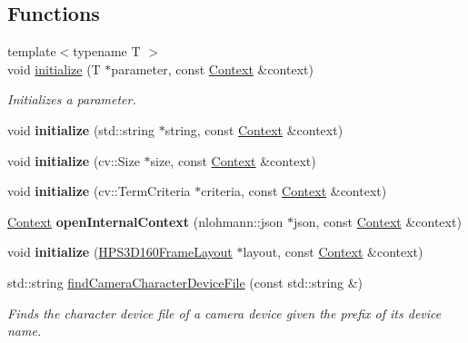 \subsection*{Functions}
\begin{DoxyCompactItemize}
\item 
{\footnotesize template$<$typename T $>$ }\\void \hyperlink{namespacestereo__ugv_a6971cc11001fdf589a71f6fb3099c65b}{initialize} (T $\ast$parameter, const \hyperlink{classstereo__ugv_1_1Context}{Context} \&context)
\begin{DoxyCompactList}\small\item\em Initializes a parameter. \end{DoxyCompactList}\item 
\mbox{\label{namespacestereo__ugv_aaa158ec1ee9178414843adbbb91a394b}} 
void {\bfseries initialize} (std\+::string $\ast$string, const \hyperlink{classstereo__ugv_1_1Context}{Context} \&context)
\item 
\mbox{\label{namespacestereo__ugv_adab204dc6f43824bcda4cd5e172d2812}} 
void {\bfseries initialize} (cv\+::\+Size $\ast$size, const \hyperlink{classstereo__ugv_1_1Context}{Context} \&context)
\item 
\mbox{\label{namespacestereo__ugv_a0a98148c84d1f085ac51c2f2fb7c8e7a}} 
void {\bfseries initialize} (cv\+::\+Term\+Criteria $\ast$criteria, const \hyperlink{classstereo__ugv_1_1Context}{Context} \&context)
\item 
\mbox{\label{namespacestereo__ugv_aef8f9a951e11f9d5d178db99754aac4b}} 
\hyperlink{classstereo__ugv_1_1Context}{Context} {\bfseries open\+Internal\+Context} (nlohmann\+::json $\ast$json, const \hyperlink{classstereo__ugv_1_1Context}{Context} \&context)
\item 
\mbox{\label{namespacestereo__ugv_ac02cc03581ba53b911a9a7bd87f9a24c}} 
void {\bfseries initialize} (\hyperlink{classstereo__ugv_1_1HPS3D160FrameLayout}{H\+P\+S3\+D160\+Frame\+Layout} $\ast$layout, const \hyperlink{classstereo__ugv_1_1Context}{Context} \&context)
\item 
std\+::string \hyperlink{namespacestereo__ugv_af45c67058883fb26e2c27945af6ab490}{find\+Camera\+Character\+Device\+File} (const std\+::string \&)
\begin{DoxyCompactList}\small\item\em Finds the character device file of a camera device given the prefix of its device name. \end{DoxyCompactList}\end{DoxyCompactItemize}


